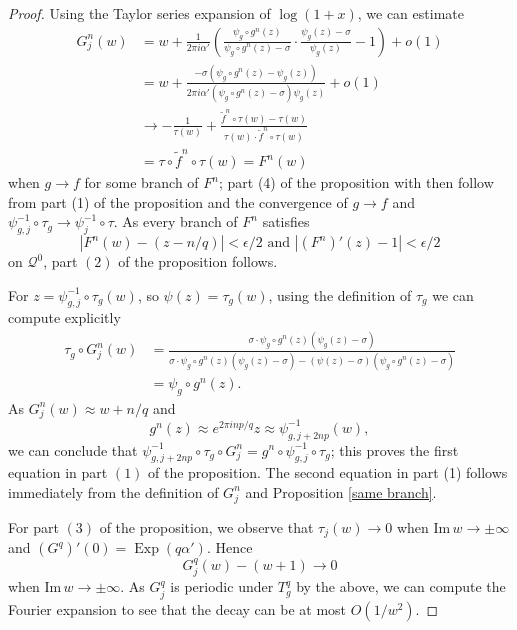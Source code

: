 \documentclass[12pt,letterpaper]{amsart}
\numberwithin{equation}{section}
\theoremstyle{remark}
\theoremstyle{definition}
\newcommand{\QQ}{\mathcal Q}
\DeclareMathOperator{\Exp}{Exp}
\begin{document}
	\begin{proof}
		Using the Taylor series expansion of $\log(1+x)$, we can estimate 
		\begin{align*}
			{G}_j^n(w) &= w+\frac{1}{2\pi i \alpha'}\left(\frac{\psi_g\circ g^n(z)}{\psi_g\circ g^n(z)- \sigma}\cdot \frac{\psi_g(z)-\sigma}{\psi_g(z)}-1\right)+o(1)\\
			&=w+\frac{-\sigma(\psi_g\circ g^n(z) - \psi_g(z))}{2\pi i \alpha'(\psi_g\circ g^n(z) - \sigma)\psi_g(z)}+o(1)\\
			&\to -\frac{1}{\tau(w)}+\frac{\tilde{f}^n\circ \tau(w) -\tau(w)}{\tau(w)\cdot \tilde{f}^n\circ \tau(w)}\\
			& = \tau\circ \tilde{f}^n\circ \tau(w) = {F}^n(w)
		\end{align*}
		when $g\to f$ for some branch of $F^n$;  part (4) of the proposition with then follow from part (1) of the proposition and the convergence of $g\to f$ and $\psi_{g, j}^{-1}\circ \tau_g\to \psi_j^{-1}\circ\tau$. As every branch of ${F}^n$ satisfies $$|{F}^n(w) - (z-n/q)|< \epsilon/2 \text{ and }|({F}^n)'(z) - 1|< \epsilon/2$$ on $\QQ^0$, part $(2)$ of the proposition follows.
		
		For $z = \psi_{g, j}^{-1}\circ \tau_g(w)$, so $\psi(z) = \tau_g(w)$, using the definition of $\tau_g$ we can compute explicitly 
		\begin{align*}
			\tau_{g}\circ {G}_j^n(w) &= \frac{\sigma\cdot \psi_g\circ g^n(z)(\psi_g(z)-\sigma)}{\sigma\cdot \psi_g\circ g^n(z)(\psi_g(z)-\sigma)-(\psi(z)-\sigma)(\psi_g\circ g^n(z)-\sigma)}\\
			&=\psi_g\circ g^n(z).
		\end{align*}
		As $G_j^n(w) \approx w+n/q$ and $$g^n(z) \approx e^{2\pi i np/q}z \approx \psi_{g,j+2np}^{-1}(w),$$ we can conclude that  $\psi_{g, j+2np}^{-1}\circ \tau_g\circ G^n_j = g^n\circ \psi_{g, j}^{-1}\circ \tau_g$; this proves the first equation in part $(1)$ of the proposition. The second equation in part (1)
		follows immediately from the definition of $G_j^n$ and Proposition \ref{same branch}.
		
		
		
		 
		For part $(3)$ of the proposition, we observe that $\tau_j(w) \to 0$ when $\text{Im}\, w\to \pm \infty$ and $(G^q)'(0) = \Exp(q\alpha').$ Hence
		$${G}_j^q(w)-(w+1)\to 0$$
		when $\text{Im}\, w\to \pm \infty$. As ${G}_j^q$ is periodic under $T_g^q$ by the above, we can compute the Fourier expansion to see that the decay can be at most $O(1/w^2)$.
	\end{proof}
	
\end{document}
